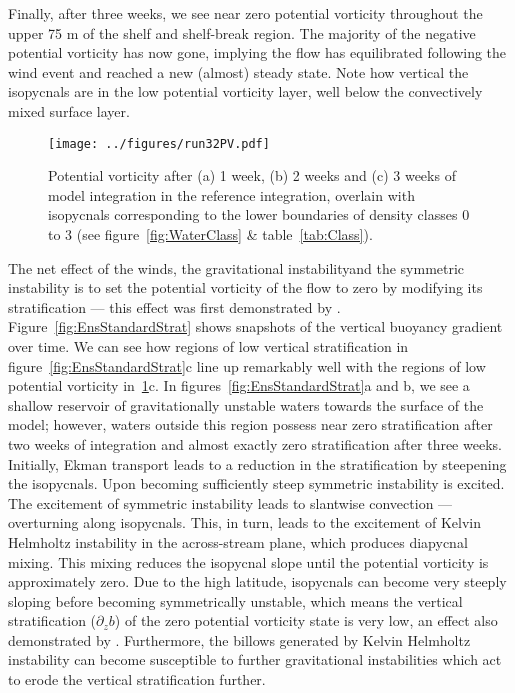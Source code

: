 Finally, after three weeks, we see near zero potential vorticity throughout the upper 75 m of the shelf and shelf-break region. The majority of the negative potential vorticity has now gone, implying the flow has equilibrated following the wind event and reached a new (almost) steady state. Note how vertical the isopycnals are in the low potential vorticity layer, well below the convectively mixed surface layer.

\begin{figure}[t]
    \centering
    \texttt{[image: ../figures/run32PV.pdf]}
    \caption{Potential vorticity after (a) 1 week, (b) 2 weeks and (c) 3 weeks of model integration in the reference integration, overlain with isopycnals corresponding to the lower boundaries of density classes 0 to 3 (see figure~\ref{fig:WaterClass} \& table~\ref{tab:Class}).}
    \label{fig:EnsStandardPV}
\end{figure}

The net effect of the winds, the gravitational instability\footnotemark and the symmetric instability is to set the potential vorticity of the flow to zero by modifying its stratification --- this effect was first demonstrated by \citet{Haine1998}.
Figure~\ref{fig:EnsStandardStrat} shows snapshots of the vertical buoyancy gradient over time. We can see how regions of low vertical stratification in figure~\ref{fig:EnsStandardStrat}c line up remarkably well with the regions of low potential vorticity in~\ref{fig:EnsStandardPV}c. In figures~\ref{fig:EnsStandardStrat}a and b, we see a shallow reservoir of gravitationally unstable waters towards the surface of the model; however, waters outside this region possess near zero stratification after two weeks of integration and almost exactly zero stratification after three weeks. Initially, Ekman transport leads to a reduction in the stratification by steepening the isopycnals. Upon becoming sufficiently steep symmetric instability is excited. The excitement of symmetric instability leads to slantwise convection --- overturning along isopycnals. This, in turn, leads to the excitement of Kelvin Helmholtz instability in the across-stream plane, which produces diapycnal mixing. This mixing reduces the isopycnal slope until the potential vorticity is approximately zero. Due to the high latitude, isopycnals can become very steeply sloping before becoming symmetrically unstable\footnotemark, which means the vertical stratification ($\partial_z b$) of the zero potential vorticity state is very low, an effect also demonstrated by \citet{Haine1998}. Furthermore, the billows generated by Kelvin Helmholtz instability can become susceptible to further gravitational instabilities which act to erode the vertical stratification further.


